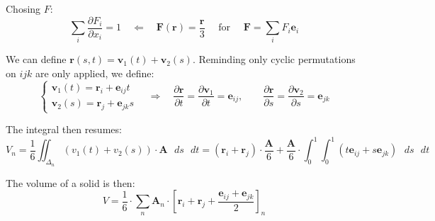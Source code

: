 Chosing $F$:
$$
\sum_i \frac{\partial F_i}{\partial x_i} = 1 \quad\Longleftarrow\quad
\mathbf F(\mathbf r) = \frac{\mathbf r}{3} \quad\mbox{ for }\quad
\mathbf F = \sum_i F_i \mathbf e_i
$$

We can define $\mathbf r(s, t) = \mathbf v_1(t) + \mathbf v_2 (s)$. Reminding only cyclic permutations on $ijk$ are only applied, we define:
\[
  \begin{cases}
   \mathbf v_1(t) = \mathbf r_i + \mathbf e_{ij}t  \\
   \mathbf v_2(s) = \mathbf r_j + \mathbf e_{jk}s
  \end{cases}
  \quad\Longrightarrow\quad
  \frac{\partial\mathbf r}{\partial t} = \frac{\partial\mathbf v_1}{\partial t} = \mathbf e_{ij}, \quad\quad
  \frac{\partial\mathbf r}{\partial s} = \frac{\partial\mathbf v_2}{\partial s} = \mathbf e_{jk}
\]

The integral then resumes:
$$
V_n = \frac{1}{6}\iint_{\Delta_n}\left( v_1(t) + v_2(s)\right)\cdot\mathbf A \mbox{ }ds\mbox{ }dt = 
\left(\mathbf r_i + \mathbf r_j\right)\cdot\frac{\mathbf A}{6} + \frac{\mathbf A}{6}\cdot\int_0^1\int_0^1\left( t \mathbf e_{ij} + s \mathbf e_{jk} \right) \mbox{ }ds\mbox{ }dt
$$

The volume of a solid is then:
$$
V = \frac{1}{6}\cdot\sum_n\mathbf A_n\cdot\left[ \mathbf r_i + \mathbf r_j + \frac{\mathbf e_{ij} + \mathbf e_{jk}}{2}  \right]_n
$$
\newpage
